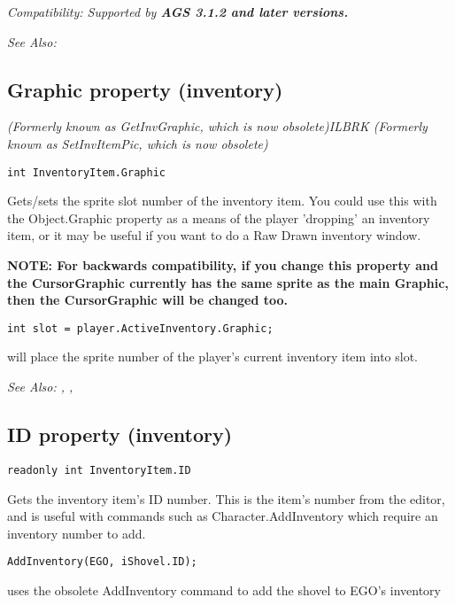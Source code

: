 \it{Compatibility:} Supported by \bf{AGS 3.1.2} and later versions.

\it{See Also:} 


\subsection{Graphic property (inventory)}\label{InventoryItem.Graphic}%

\it{(Formerly known as GetInvGraphic, which is now obsolete)}ILBRK
\it{(Formerly known as SetInvItemPic, which is now obsolete)}

\begin{verbatim}
int InventoryItem.Graphic
\end{verbatim}
Gets/sets the sprite slot number of the inventory item. You could use this
with the Object.Graphic property as a means of the player 'dropping' an inventory item, or
it may be useful if you want to do a Raw Drawn inventory window.

\bf{NOTE:} For backwards compatibility, if you change this property and the CursorGraphic
currently has the same sprite as the main Graphic, then the CursorGraphic will be changed
too.

\begin{verbatim}
int slot = player.ActiveInventory.Graphic;
\end{verbatim}
will place the sprite number of the player's current inventory item into slot.

\it{See Also:} ,
,


\subsection{ID property (inventory)}\label{InventoryItem.ID}%

\begin{verbatim}
readonly int InventoryItem.ID
\end{verbatim}
Gets the inventory item's ID number. This is the item's number from the editor, and is
useful with commands such as Character.AddInventory which require an inventory number
to add.

\begin{verbatim}
AddInventory(EGO, iShovel.ID);
\end{verbatim}
uses the obsolete AddInventory command to add the shovel to EGO's inventory

